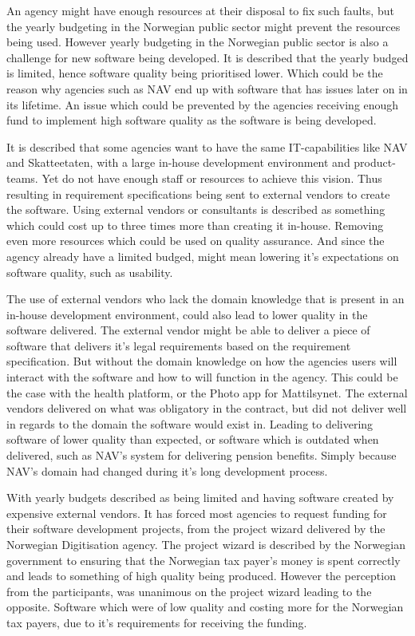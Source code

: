 An agency might have enough resources at their disposal to fix such faults, but the yearly budgeting in the Norwegian public sector might prevent the resources being used. However yearly budgeting in the Norwegian public sector is also a challenge for new software being developed. It is described that the yearly budged is limited, hence software quality being prioritised lower. Which could be the reason why agencies such as NAV end up with software that has issues later on in its lifetime. An issue which could be prevented by the agencies receiving enough fund to implement high software quality as the software is being developed.

It is described that some agencies want to have the same IT-capabilities like NAV and Skatteetaten, with a large in-house development environment and product-teams. Yet do not have enough staff or resources to achieve this vision. Thus resulting in requirement specifications being sent to external vendors to create the software. Using external vendors or consultants is described as something which could cost up to three times more than creating it in-house. Removing even more resources which could be used on quality assurance. And since the agency already have a limited budged, might mean lowering it's expectations on software quality, such as usability.

The use of external vendors who lack the domain knowledge that is present in an in-house development environment, could also lead to lower quality in the software delivered. The external vendor might be able to deliver a piece of software that delivers it's legal requirements based on the requirement specification. But without the domain knowledge on how the agencies users will interact with the software and how to will function in the agency. This could be the case with the health platform, or the Photo app for Mattilsynet. The external vendors delivered on what was obligatory in the contract, but did not deliver well in regards to the domain the software would exist in. Leading to delivering software of lower quality than expected, or software which is outdated when delivered, such as NAV's system for delivering pension benefits. Simply because NAV's domain had changed during it's long development process.

With yearly budgets described as being limited and having software created by expensive external vendors. It has forced most agencies to request funding for their software development projects, from the project wizard delivered by the Norwegian Digitisation agency. The project wizard is described by the Norwegian government to ensuring that the Norwegian tax payer's money is spent correctly and leads to something of high quality being produced. However the perception from the participants, was unanimous on the project wizard leading to the opposite. Software which were of low quality and costing more for the Norwegian tax payers, due to it's requirements for receiving the funding.

